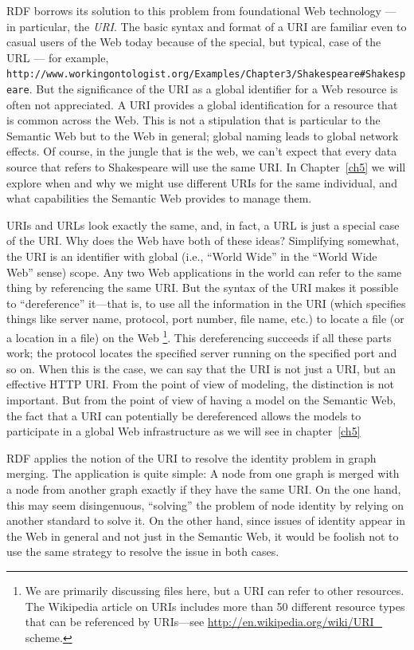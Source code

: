 RDF borrows its solution to this problem from foundational Web
technology --- in particular, the \emph{URI}. The basic syntax and format of a URI are
familiar even to casual users of the Web today because of the special,
but typical, case of the URL --- for example,
\texttt{http://www.workingontologist.org/Examples/Chapter3/Shakespeare\#Shakespeare}. 
But the significance of the URI as a
global identifier for a Web resource is often not appreciated. A URI
provides a global identification for a resource that is common across
the Web. This is not a stipulation that is particular to the Semantic
Web but to the Web in general; global naming leads to global network
effects. Of course, in the jungle that is the web, we can't expect that
every data source that refers to Shakespeare will use the same URI.  In
Chapter~\ref{ch5} we will explore when and why we might use different URIs for
the same individual, and what capabilities the Semantic Web provides to
manage them.

URIs and URLs look exactly the same, and, in fact, a URL is just a
special case of the URI. Why does the Web have both of these ideas?
Simplifying somewhat, the URI is an identifier with global (i.e.,
``World Wide'' in the ``World Wide Web'' sense) scope. Any two Web
applications in the world can refer to the same thing by referencing the
same URI. But the syntax of the URI makes it possible to ``dereference''
it---that is, to use all the information in the URI (which specifies
things like server name, protocol, port number, file name, etc.) to
locate a file (or a location in a file) on the Web \footnote{We are primarily discussing files here, but a URI can refer to other
resources. The Wikipedia article on URIs includes more than 50 different
resource types that can be referenced by URIs---see
\url{http://en.wikipedia.org/wiki/URI_} scheme.}. This
dereferencing succeeds if all these parts work; the protocol locates the
specified server running on the specified port and so on. When this is
the case, we can say that the URI is not just a URI, but an effective
HTTP URI. From the point of view of modeling, the distinction is not
important. But from the point of view of having a model on the Semantic
Web, the fact that a URI can potentially be dereferenced allows the
models to participate in a global Web infrastructure as we will see in
chapter~\ref{ch5}

RDF applies the notion of the URI to resolve the identity problem in
graph merging. The application is quite simple: A node from one graph is
merged with a node from another graph exactly if they have the same
URI. On the one hand, this may seem disingenuous, ``solving'' the
problem of node identity by relying on another standard to solve it. On
the other hand, since issues of identity appear in the Web in general
and not just in the Semantic Web, it would be foolish not to use the
same strategy to resolve the issue in both cases.

